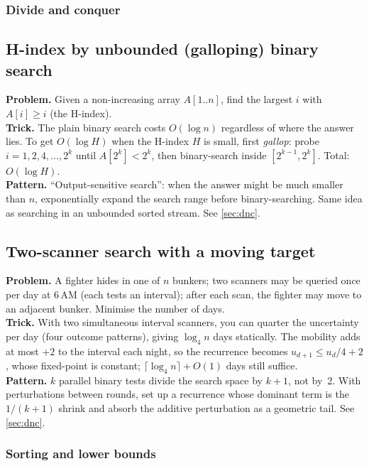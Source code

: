 \subsubsection*{Divide and conquer}

\subsection{H-index by unbounded (galloping) binary search}
\textbf{Problem.} Given a non-increasing array $A[1..n]$, find the largest $i$ with $A[i] \geq i$ (the H-index).\\
\textbf{Trick.} The plain binary search costs $O(\log n)$ regardless of where the answer lies. To get $O(\log H)$ when the H-index $H$ is small, first \emph{gallop}: probe $i = 1, 2, 4, \ldots, 2^k$ until $A[2^k] < 2^k$, then binary-search inside $[2^{k-1}, 2^k]$. Total: $O(\log H)$.\\
\textbf{Pattern.} ``Output-sensitive search'': when the answer might be much smaller than $n$, exponentially expand the search range before binary-searching. Same idea as searching in an unbounded sorted stream. See \cref{sec:dnc}.

\subsection{Two-scanner search with a moving target}
\textbf{Problem.} A fighter hides in one of $n$ bunkers; two scanners may be queried once per day at 6\,AM (each tests an interval); after each scan, the fighter may move to an adjacent bunker. Minimise the number of days.\\
\textbf{Trick.} With two simultaneous interval scanners, you can quarter the uncertainty per day (four outcome patterns), giving $\log_4 n$ days statically. The mobility adds at most $+2$ to the interval each night, so the recurrence becomes $u_{d+1} \leq u_d/4 + 2$, whose fixed-point is constant; $\lceil \log_4 n\rceil + O(1)$ days still suffice.\\
\textbf{Pattern.} $k$ parallel binary tests divide the search space by $k+1$, not by~2. With perturbations between rounds, set up a recurrence whose dominant term is the $1/(k+1)$ shrink and absorb the additive perturbation as a geometric tail. See \cref{sec:dnc}.

\subsubsection*{Sorting and lower bounds}

